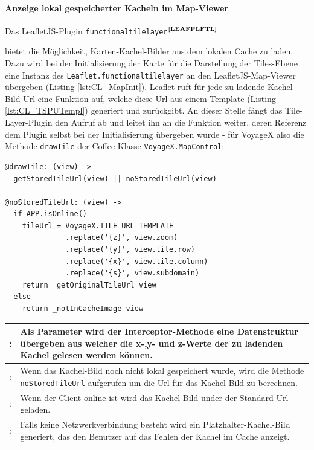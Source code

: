 \paragraph{Anzeige lokal gespeicherter Kacheln im Map-Viewer}
Das LeafletJS-Plugin \texttt{functionaltilelayer}$^{\textbf{\ref{LEAFPLFTL}}}$
\addtocounter{footnote}{1}%
%
bietet die Möglichkeit, Karten-Kachel-Bilder aus dem lokalen Cache zu laden.\\
Dazu wird bei der Initialisierung der Karte für die Darstellung der Tiles-Ebene eine Instanz des \texttt{Leaflet.functionaltilelayer} an den LeafletJS-Map-Viewer übergeben (Listing \ref{lst:CL_MapInit}).
Leaflet ruft für jede zu ladende Kachel-Bild-Url eine Funktion auf, welche diese Url aus einem Template (Listing \ref{lst:CL_TSPUTempl}) generiert und zurückgibt. An dieser Stelle fängt das Tile-Layer-Plugin den Aufruf ab und leitet
ihn an die Funktion weiter, deren Referenz dem Plugin selbst bei der Initialisierung übergeben wurde - für VoyageX also die Methode \texttt{drawTile} der Coffee-Klasse \texttt{VoyageX.MapControl}:
\lstset{language=CoffeeScript}
\begin{lstlisting}[frame=single,xleftmargin=0pt]
@drawTile: (view) ->
  getStoredTileUrl(view) || noStoredTileUrl(view)

@noStoredTileUrl: (view) ->
  if APP.isOnline()
  	tileUrl = VoyageX.TILE_URL_TEMPLATE
              .replace('{z}', view.zoom)
              .replace('{y}', view.tile.row)
              .replace('{x}', view.tile.column)
              .replace('{s}', view.subdomain)
    return _getOriginalTileUrl view
  else
    return _notInCacheImage view
\end{lstlisting}%
\begin{table}[H]
  \begin{tabulary}{\columnwidth}{>{\raggedleft}m{.5cm} L}
  : & Als Parameter wird der Interceptor-Methode eine Datenstruktur übergeben aus welcher die x-,y- und z-Werte der zu ladenden Kachel gelesen werden können. \\ : & Wenn das Kachel-Bild noch nicht lokal gespeichert wurde, wird die Methode \texttt{noStoredTileUrl} aufgerufen um die Url für das Kachel-Bild zu berechnen. \\ : & Wenn der Client online ist wird das Kachel-Bild under der Standard-Url geladen. \\ : & Falls keine Netzwerkverbindung besteht wird ein Platzhalter-Kachel-Bild generiert, das den Benutzer auf das Fehlen der Kachel im Cache anzeigt. \\ \hline
  \end{tabulary}
\end{table}
